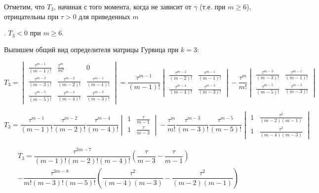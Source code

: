 Отметим, что $T_3$, начиная с того момента, когда не зависит от $\gamma$ (т.е. при $m \geq 6$), отрицательны при $\tau>0$ для приведенных $m$

. $T_3 < 0$ при $m \geq 6$.

Выпишем общий вид определителя матрицы Гурвица при $k=3$:

\begin{equation*}
T_3 = 
\begin{vmatrix}
\frac{\tau^{m-1}}{(m-1)!} & \frac{\tau^{m}}{m!} & 0\\
\frac{\tau^{m-3}}{(m-3)!} & \frac{\tau^{m-2}}{(m-2)!} & \frac{\tau^{m-1}}{(m-1)!}\\
\frac{\tau^{m-5}}{(m-5)!} & \frac{\tau^{m-4}}{(m-4)!} & \frac{\tau^{m-3}}{(m-3)!}
\end{vmatrix} =
\dfrac{\tau^{m-1}}{(m-1)!}
\begin{vmatrix}
\frac{\tau^{m-2}}{(m-2)!} & \frac{\tau^{m-1}}{(m-1)!}\\
\frac{\tau^{m-4}}{(m-4)!} & \frac{\tau^{m-3}}{(m-3)!}
\end{vmatrix}
- \dfrac{\tau^{m}}{m!}
\begin{vmatrix}
\frac{\tau^{m-3}}{(m-3)!} & \frac{\tau^{m-1}}{(m-1)!}\\
\frac{\tau^{m-5}}{(m-5)!} & \frac{\tau^{m-3}}{(m-3)!}
\end{vmatrix}
\end{equation*}

\begin{equation*}
T_3 =
\dfrac{\tau^{m-1}}{(m-1)!} \dfrac{\tau^{m-2}}{(m-2)!} \dfrac{\tau^{m-4}}{(m-4)!}
\begin{vmatrix}
1 & \frac{\tau}{m-1}\\
1 & \frac{\tau}{m-3}
\end{vmatrix}
- \dfrac{\tau^{m}}{m!} \dfrac{\tau^{m-3}}{(m-3)!} \dfrac{\tau^{m-5}}{(m-5)!}
\begin{vmatrix}
1 & \frac{\tau^2}{(m-2)(m-1)}\\
1 & \frac{\tau^2}{(m-4)(m-3)}
\end{vmatrix}
\end{equation*}

\begin{multline*}
T_3 = \dfrac{\tau^{3m-7}}{(m-1)!(m-2)!(m-4)!} \left( \dfrac{\tau}{m-3} - \dfrac{\tau}{m-1} \right) \\ - \dfrac{\tau^{3m-8}}{m!(m-3)!(m-5)!} \left( \dfrac{\tau^2}{(m-4)(m-3)} - \dfrac{\tau^2}{(m-2)(m-1)} \right)
\end{multline*}

